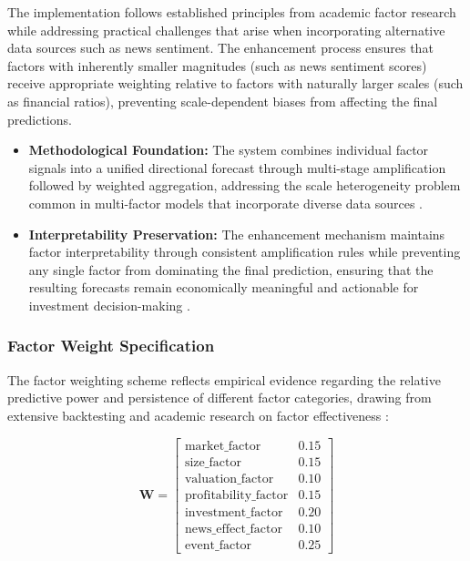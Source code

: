 \documentclass[3p,times,procedia]{elsarticle}
\begin{document}
The implementation follows established principles from academic factor research \cite{FAMA1993} while addressing practical challenges that arise when incorporating alternative data sources such as news sentiment. The enhancement process ensures that factors with inherently smaller magnitudes (such as news sentiment scores) receive appropriate weighting relative to factors with naturally larger scales (such as financial ratios), preventing scale-dependent biases from affecting the final predictions.

\begin{itemize}
    \item \textbf{Methodological Foundation:} The system combines individual factor signals into a unified directional forecast through multi-stage amplification followed by weighted aggregation, addressing the scale heterogeneity problem common in multi-factor models that incorporate diverse data sources \cite{Harvey2016}.
    \item \textbf{Interpretability Preservation:} The enhancement mechanism maintains factor interpretability through consistent amplification rules while preventing any single factor from dominating the final prediction, ensuring that the resulting forecasts remain economically meaningful and actionable for investment decision-making \cite{Ribeiro2016}.
\end{itemize}

\subsubsection{{Factor Weight Specification}}

The factor weighting scheme reflects empirical evidence regarding the relative predictive power and persistence of different factor categories, drawing from extensive backtesting and academic research on factor effectiveness \cite{Carhart1997,Harvey2016}:

\begin{equation}
\textbf{W} = 
\begin{bmatrix} 
\text{market\_factor} & 0.15 \\ 
\text{size\_factor} & 0.15 \\ 
\text{valuation\_factor} & 0.10 \\ 
\text{profitability\_factor} & 0.15 \\ 
\text{investment\_factor} & 0.20 \\ 
\text{news\_effect\_factor} & 0.10 \\ 
\text{event\_factor} & 0.25
\end{bmatrix}
\end{equation}
\end{document}

